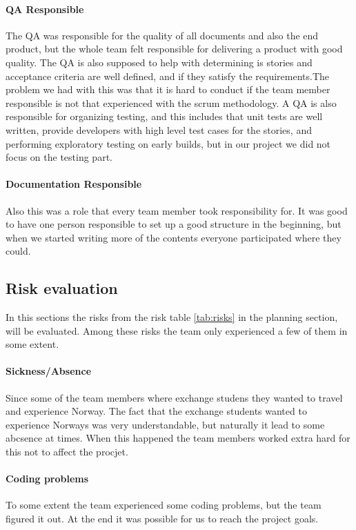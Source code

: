 \paragraph{QA Responsible}
The QA was responsible for the quality of all documents and also the end product, but the whole team felt responsible for delivering a product with good quality. The QA is also supposed to help with determining is stories and acceptance criteria are well defined, and if they satisfy the requirements.The problem we had with this was that it is hard to conduct if the team member responsible is not that experienced with the scrum methodology. A QA is also responsible for organizing testing, and this includes that unit tests are well written, provide developers with high level test cases for the stories, and performing exploratory testing on early builds, but in our project we did not focus on the testing part. 

\paragraph{Documentation Responsible}
Also this was a role that every team member took responsibility for. It was good to have one person responsible to set up a good structure in the beginning, but when we started writing more of the contents everyone participated where they could. 

\subsection{Risk evaluation}
In this sections the risks from the risk table \ref{tab:risks} in the planning section, will be evaluated. Among these risks the team only experienced a few of them in some extent.

\paragraph{Sickness/Absence}
Since some of the team members where exchange studens they wanted to travel and experience Norway. The fact that the exchange students wanted to experience Norways was very understandable, but naturally it lead to some abcsence at times. When this happened the team members worked extra hard for this not to affect the procjet. 

\paragraph{Coding problems}
To some extent the team experienced some coding problems, but the team figured it out. At the end it was possible for us to reach the project goals. 

